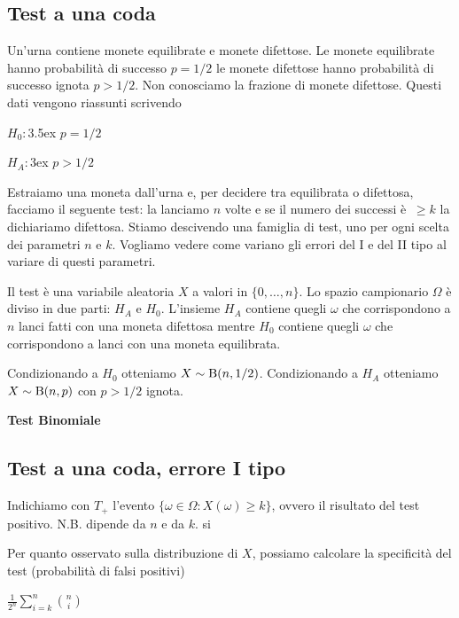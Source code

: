 \documentclass[12pt,openany]{book}
\theoremstyle{mio}
\theoremstyle{liscio}
\begin{document}
\subsection{Test a una coda}\label{Bernoulli_test}

Un'urna contiene monete equilibrate e monete difettose. Le monete equilibrate hanno probabilità di successo $p=1/2$ le monete difettose hanno probabilità di successo ignota $p>1/2$. Non conosciamo la frazione di monete difettose. Questi dati vengono riassunti scrivendo

$H_0:$\kern3.5ex $p=1/2$

$H_A:$\kern3ex $p>1/2$
 
Estraiamo una moneta dall'urna e, per decidere tra equilibrata o difettosa, facciamo il seguente test: la lanciamo $n$ volte e se il numero dei successi è $\ \ge k$ la dichiariamo difettosa. Stiamo descivendo una famiglia di test, uno per ogni scelta dei parametri $n$ e $k$. Vogliamo vedere come variano gli errori del I e del II tipo al variare di questi parametri. 

Il test è una variabile aleatoria $X$ a valori in $\{0,\dots,n\}$. Lo spazio campionario $\Omega$ è diviso in due parti: $H_A$ e $H_0$.  L'insieme $H_A$ contiene quegli $\omega$ che corrispondono a $n$ lanci fatti con una moneta difettosa mentre $H_0$ contiene quegli $\omega$ che corrispondono a lanci con una moneta equilibrata. 

Condizionando a $H_0$ otteniamo $X\sim {\rm B}(n,1/2)$. Condizionando a $H_A$ otteniamo $X\sim {\rm B}(n,p)$ con $p>1/2$ ignota.


\hfill{}\clearpage\hfill\textbf{Test Binomiale}\subsection{Test a una coda, errore I tipo}

Indichiamo con $T_+$ l'evento $\{\omega\in\Omega: X(\omega)\ge k\}$, ovvero il risultato del test positivo. N.B. dipende da $n$ e da $k$.
si

Per quanto osservato sulla distribuzione di $X$, possiamo calcolare la specificità del test (probabilità di falsi positivi)



\medrel{=}$\displaystyle\frac1{2^n}\sum^n_{i=k} {n\choose i}$
\end{document}
